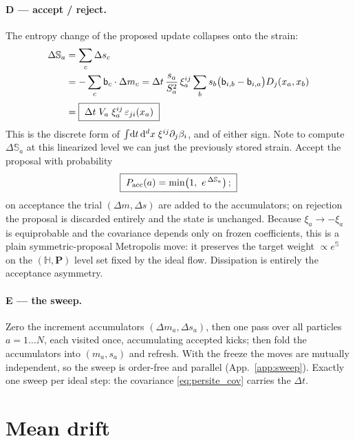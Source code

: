 \documentclass[12pt,aps,preprint,nofootinbib,noshowkeys,noshowpacs,longbibliography,superscriptaddress,tightenlines]{revtex4-2}
\def\Sbb{{\mathbb S}}
\def\bbeta{{\sf b}}
\newcommand{\nn}{\nonumber}
\def\app#1{App.~\ref{#1}}
\def\st{\begin{equation}}
\def\stp{\end{equation}}
\def\dd{{\rm d}}
\begin{document}
\paragraph{D --- accept / reject.}
The entropy change of the proposed update collapses onto the strain:
\begin{align}
\Delta\Sbb_a
  &= \sum_c \Delta s_c \\
  &= -\sum_c \bbeta_c\cdot\Delta m_c
   = \Delta t\,\frac{s_a}{S_a^{2}}\,\xi_a^{ij}
     \sum_b s_b\big(\bbeta_{i,b}-\bbeta_{i,a}\big)D_j(x_a,x_b) \nn\\[2pt]
  &= \boxed{\;\Delta t\;V_a\;\xi_a^{ij}\,\varepsilon_{ji}(x_a)\;}
\label{eq:dSa}
\end{align}
This is the discrete form of $\int\!\dd t\,\dd^d x\;\xi^{ij}\partial_j\beta_i$,
and of either sign.  Note to compute $\Delta \Sbb_a$ at this linearized level we can just the previously stored strain.  Accept the proposal with probability
\st
\boxed{\;
P_{\rm acc}(a) = \min\!\big(1,\ e^{\,\Delta\Sbb_a}\big)\,;
\;}
\stp
on acceptance the trial $(\Delta m,\Delta s)$ are added to the accumulators;
on rejection the proposal is discarded entirely and the state is unchanged.
Because
$\xi_a\to-\xi_a$ is equiprobable and the covariance depends only on frozen
coefficients, this is a plain symmetric-proposal Metropolis move: it preserves
the target weight $\propto e^{\Sbb}$ on the $(\mathbb H,\mathbf P)$ level set
fixed by the ideal flow.  Dissipation is entirely the acceptance asymmetry.

\paragraph{E --- the sweep.}
Zero the increment accumulators $(\Delta m_a,\Delta s_a)$, then one pass over
all particles $a=1\dots N$, each visited once, accumulating accepted kicks;
then fold the accumulators into $(m_a,s_a)$ and refresh.  With the freeze the
moves are mutually independent, so the sweep is order-free and parallel
(\app{app:sweep}).  Exactly one sweep per ideal step: the covariance
\eqref{eq:persite_cov} carries the $\Delta t$.

\section{Mean drift}
\label{sec:det}
\end{document}
